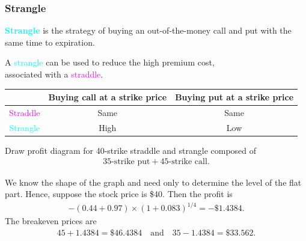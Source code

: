 \begin{frame}[fragile,t]
	\frametitle{Strangle}

	\textcolor{cyan}{\bf Strangle} is the strategy of	buying an out-of-the-money call and put with
	the same time to expiration.
	\bigskip

	\begin{center}
		A \textcolor{cyan}{strangle} can be used to reduce the high premium cost, \\
		associated with a \textcolor{magenta}{straddle}.
	\end{center}

	\vfill
	\begin{center}
		\renewcommand{\arraystretch}{1.2}
		\begin{tabular}{c|cc}
			\hline
                                    & Buying call at a strike price & Buying put at a strike price \\ \hline
			\textcolor{magenta}{Straddle} & Same                          & Same                         \\
			\textcolor{cyan}{Strangle}    & High                          & Low                          \\
			\hline
		\end{tabular}

	\end{center}
\end{frame}
\begin{frame}[fragile,t]
	\begin{myexample}
		Draw profit diagram for 40-strike straddle and strangle composed of
		\begin{align*}
			\text{35-strike put} + \text{45-strike call}.
		\end{align*}
	\end{myexample}
	\pause
	\bigskip
	\begin{mysol}
		We know the shape of the graph and need only to determine the level of the flat part. Hence,
		suppose the stock price is \$40. Then the profit is
		\begin{align*}
			-(0.44+0.97)\times(1+0.083)^{1/4}=-\$1.4384.
		\end{align*}
		The breakeven prices are
		\begin{align*}
			45+1.4384 = \$46.4384 \quad \text{and} \quad 35-1.4384 = \$ 33.562.
		\end{align*}
	\end{mysol}
\end{frame}
